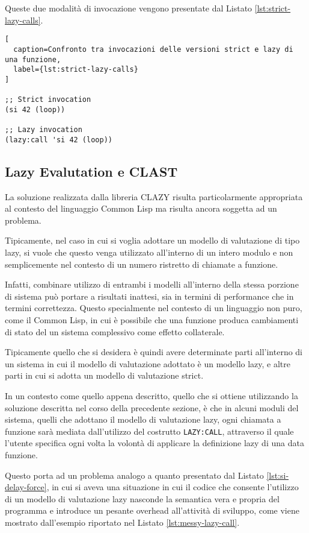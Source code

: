 Queste due modalità di invocazione vengono presentate dal Listato
\ref{lst:strict-lazy-calls}.

\begin{lstlisting}[
  caption=Confronto tra invocazioni delle versioni strict e lazy di una funzione,
  label={lst:strict-lazy-calls}
]

;; Strict invocation
(si 42 (loop))

;; Lazy invocation
(lazy:call 'si 42 (loop))

\end{lstlisting}

\subsection{Lazy Evalutation e CLAST}

La soluzione realizzata dalla libreria CLAZY risulta particolarmente appropriata
al contesto del linguaggio Common Lisp ma risulta ancora soggetta ad un
problema.

Tipicamente, nel caso in cui si voglia adottare un modello di valutazione di
tipo lazy, si vuole che questo venga utilizzato all'interno di un intero modulo
e non semplicemente nel contesto di un numero ristretto di chiamate a funzione.

Infatti, combinare utilizzo di entrambi i modelli all'interno della stessa
porzione di sistema può portare a risultati inattesi, sia in termini di
performance che in termini correttezza. Questo specialmente nel contesto di un
linguaggio non puro, come il Common Lisp, in cui è possibile che una funzione
produca cambiamenti di stato del un sistema complessivo come effetto
collaterale.

Tipicamente quello che si desidera è quindi avere determinate parti all'interno
di un sistema in cui il modello di valutazione adottato è un modello lazy, e
altre parti in cui si adotta un modello di valutazione strict.

In un contesto come quello appena descritto, quello che si ottiene utilizzando
la soluzione descritta nel corso della precedente sezione, è che in alcuni
moduli del sistema, quelli che adottano il modello di valutazione lazy, ogni
chiamata a funzione sarà mediata dall'utilizzo del costrutto \texttt{LAZY:CALL},
attraverso il quale l'utente specifica ogni volta la volontà di applicare la
definizione lazy di una data funzione.

Questo porta ad un problema analogo a quanto presentato dal Listato
\ref{lst:si-delay-force}, in cui si aveva una situazione in cui il codice che
consente l’utilizzo di un modello di valutazione lazy nasconde la semantica vera
e propria del programma e introduce un pesante overhead all'attività di
sviluppo, come viene mostrato dall'esempio riportato nel Listato
\ref{lst:messy-lazy-call}.

